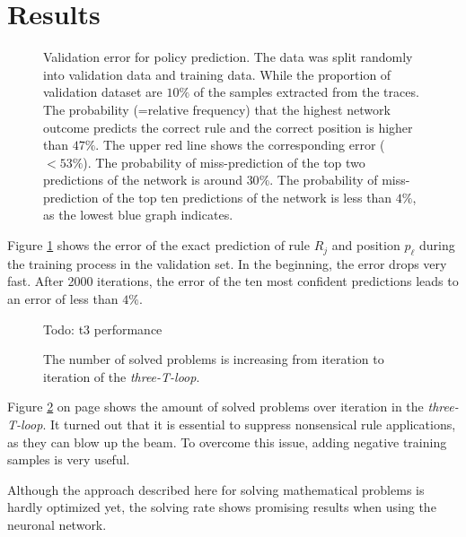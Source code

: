 \documentclass{scrartcl}
\theoremstyle{definition}
\begin{document}
\section{Results}

\begin{figure}[!htbp]
	\centering
	
	\caption{Validation error for policy prediction. The data was split randomly into validation data and training data.
	While the proportion of validation dataset are $10\%$ of the samples extracted from the traces.
	The probability (=relative frequency) that the highest network outcome predicts the correct rule and the correct position is higher than $ 47\%$.
	The upper red line shows the corresponding error ($<53\%$).
	The probability of miss-prediction of the top two predictions of the network is around $30\%$.
	The probability of miss-prediction of the top ten predictions of the network is less than $4\%$, as the lowest blue graph indicates.
	}
	\label{fig:training}
\end{figure}

Figure \ref{fig:training} shows the error of the exact prediction of rule $R_j$ and position $p_\ell$ during the training process in the validation set.
In the beginning, the error drops very fast. After 2000 iterations, the error of the ten most confident predictions leads to an error of less than $4\%$.


\begin{figure}[!htbp]
	\centering
	Todo: t3 performance
	\caption{The number of solved problems is increasing from iteration to iteration of the \textit{three-T-loop}.}
	\label{fig:t3loop_performance}
\end{figure}

Figure \ref{fig:t3loop_performance} on page \pageref{fig:t3loop_performance} shows the amount of solved problems over iteration in the \textit{three-T-loop}. 
It turned out that it is essential to suppress nonsensical rule applications, as they can blow up the beam.
To overcome this issue, adding negative training samples is very useful.

Although the approach described here for solving mathematical problems is hardly optimized yet,
the solving rate shows promising results when using the neuronal network.
\end{document}
